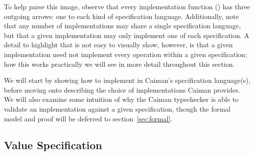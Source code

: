 
To help parse this image, observe that every implementation function () has three outgoing arrows: one to each kind of specification language.  Additionally, note that any number of implementations may share a single specification language, but that a given implementation may only implement one of each specification.  A detail to highlight that is not easy to visually show, however, is that a given implementation need not implement every operation within a given specification; how this works practically we will see in more detail throughout this section.

We will start by showing how to implement  in Caiman's specification language(s), before moving onto describing the choice of implementations Caiman provides.  We will also examine some intuition of why the Caiman typechecker is able to validate an implementation against a given specification, though the formal model and proof will be deferred to section~\ref{sec:formal}.

\subsection{Value Specification}
\label{subsec:value}

